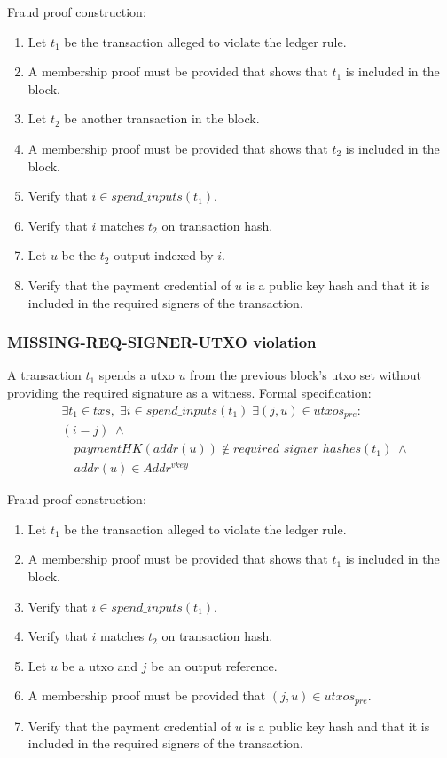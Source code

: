 \documentclass[../midgard.tex]{subfiles}
\begin{document}
Fraud proof construction:
\begin{enumerate}
  \item Let $t_1$ be the transaction alleged to violate the ledger rule.
  \item A membership proof must be provided that shows that $t_1$ is included in the block.
  \item Let $t_2$ be another transaction in the block.
  \item A membership proof must be provided that shows that $t_2$ is included in the block.
  \item Verify that $i \in spend\_inputs(t_1)$.
  \item Verify that $i$ matches $t_2$ on transaction hash. 
  \item Let $u$ be the $t_2$ output indexed by $i$. 
  \item Verify that the payment credential of $u$ is a public key hash and that it is included in the required signers of the transaction.
\end{enumerate}

\subsubsection{MISSING-REQ-SIGNER-UTXO violation}
\label{violation:MISSING-REQ-SIGNER-UTXO}
A transaction $t_1$ spends a utxo $u$ from the previous block's utxo set without providing the required signature as a witness.
Formal specification:
\begin{equation*}
\begin{split}
  &\exists t_1 \in txs,\; \exists i \in spend\_inputs(t_1)\; \exists (j,u) \in utxos_{pre} : \\
    &(i = j) \;\land\\
    &\quad paymentHK(addr(u)) \notin required\_signer\_hashes(t_1) \;\land\\
    &\quad addr(u) \in Addr^{vkey}
\end{split}
\end{equation*}

Fraud proof construction:
\begin{enumerate}
  \item Let $t_1$ be the transaction alleged to violate the ledger rule.
  \item A membership proof must be provided that shows that $t_1$ is included in the block.
  \item Verify that $i \in spend\_inputs(t_1)$.
  \item Verify that $i$ matches $t_2$ on transaction hash. 
  \item Let $u$ be a utxo and $j$ be an output reference. 
  \item A membership proof must be provided that $(j,u) \in utxos_{pre}$.
  \item Verify that the payment credential of $u$ is a public key hash and that it is included in the required signers of the transaction.
\end{enumerate}
\end{document}
